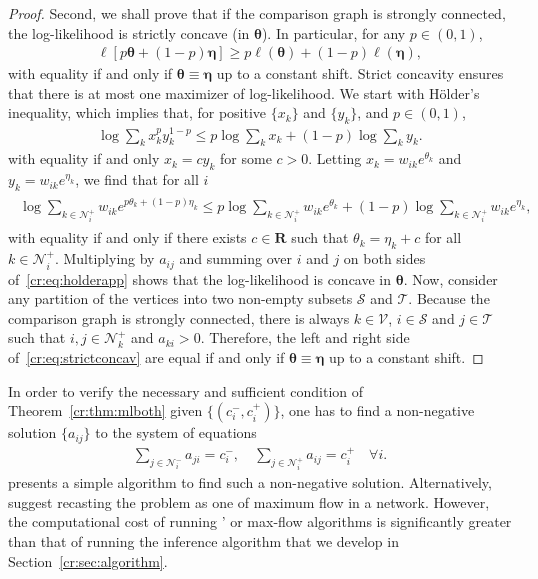 \begin{proof}
Second, we shall prove that if the comparison graph is strongly connected, the log-likelihood is strictly concave (in $\bm{\theta}$).
In particular, for any $p \in (0,1)$,
\begin{align}
\label{cr:eq:strictconcav}
\ell \left[ p \bm{\theta} + (1-p) \bm{\eta} \right] \ge p \ell(\bm{\theta}) + (1-p) \ell(\bm{\eta}),
\end{align}
with equality if and only if $\bm{\theta} \equiv \bm{\eta}$ up to a constant shift.
Strict concavity ensures that there is at most one maximizer of log-likelihood.
We start with Hölder's inequality, which implies that, for positive $\{ x_k \}$ and $\{ y_k \}$, and $p \in (0,1)$,
\begin{align*}
\log \sum_k x_k^p y_k^{1-p} \le p \log \sum_k x_k + (1-p) \log \sum_k y_k.
\end{align*}
with equality if and only $x_k = c y_k$ for some $c > 0$.
Letting $x_k = w_{ik} e^{\theta_k}$ and $y_k = w_{ik} e^{\eta_k}$, we find that for all $i$
\begin{align}
\label{cr:eq:holderapp}
\begin{aligned}
\log \sum_{k \in \mathcal{N}^+_i} w_{ik} e^{p \theta_k + (1-p) \eta_k}
    \le p \log\!\sum_{k \in \mathcal{N}^+_i}\!w_{ik} e^{\theta_k} + (1-p) \log\!\sum_{k \in \mathcal{N}^+_i}\!w_{ik} e^{\eta_k},
\end{aligned}
\end{align}
with equality if and only if there exists $c \in \mathbf{R}$ such that $\theta_k = \eta_k + c$ for all $k \in \mathcal{N}^+_{i}$.
Multiplying by $a_{ij}$ and summing over $i$ and $j$ on both sides of~\eqref{cr:eq:holderapp} shows that the log-likelihood is concave in $\bm{\theta}$.
Now, consider any partition of the vertices into two non-empty subsets $\mathcal{S}$ and $\mathcal{T}$.
Because the comparison graph is strongly connected, there is always $k \in \mathcal{V}$, $i \in \mathcal{S}$ and $j \in \mathcal{T}$ such that $i, j \in \mathcal{N}^+_k$ and $a_{ki} > 0$.
Therefore, the left and right side of~\eqref{cr:eq:strictconcav} are equal if and only if $\bm{\theta} \equiv \bm{\eta}$ up to a constant shift.
\end{proof}

In order to verify the necessary and sufficient condition of Theorem~\ref{cr:thm:mlboth} given $\{ (c^-_i, c^+_i) \}$, one has to find a non-negative solution $\{ a_{ij} \}$ to the system of equations
\begin{align*}
\sum_{j \in \mathcal{N}^-_i} a_{ji} = c^-_i, \quad
\sum_{j \in \mathcal{N}^+_i} a_{ij} = c^+_i \quad \forall i.
\end{align*}
\citet{dines1926positive} presents a simple algorithm to find such a non-negative solution.
Alternatively, \citet{kumar2015inverting} suggest recasting the problem as one of maximum flow in a network.
However, the computational cost of running \citeauthor{dines1926positive}' or max-flow algorithms is significantly greater than that of running the inference algorithm that we develop in Section~\ref{cr:sec:algorithm}.

